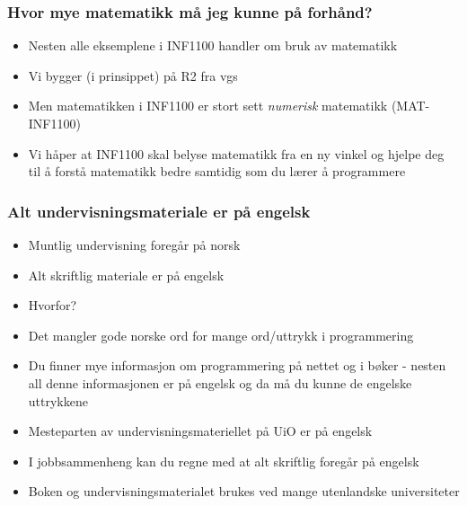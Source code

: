 \documentclass{beamer}
\begin{document}
\begin{frame}
\frametitle{Hvor mye matematikk må jeg kunne på forhånd?}

\begin{block}{}
\begin{itemize}
  \item Nesten alle eksemplene i INF1100 handler om bruk av matematikk

  \item Vi bygger (i prinsippet) på R2 fra vgs

  \item Men matematikken i INF1100 er stort sett \emph{numerisk} matematikk (MAT-INF1100)

  \item Vi håper at INF1100 skal belyse matematikk fra en ny vinkel og hjelpe deg til å forstå matematikk bedre samtidig som du lærer å programmere
\end{itemize}

\noindent
\end{block}
\end{frame}

\begin{frame}
\frametitle{Alt undervisningsmateriale er på engelsk}

\begin{block}{}
\begin{itemize}
  \item Muntlig undervisning foregår på norsk

  \item Alt skriftlig materiale er på engelsk

  \item Hvorfor?

  \item Det mangler gode norske ord for mange ord/uttrykk i programmering

  \item Du finner mye informasjon om programmering på nettet og i bøker - nesten all denne informasjonen er på engelsk og da må du kunne de engelske uttrykkene

  \item Mesteparten av undervisningsmateriellet på UiO er på engelsk

  \item I jobbsammenheng kan du regne med at alt skriftlig foregår på engelsk

  \item Boken og undervisningsmaterialet brukes ved mange utenlandske universiteter
\end{itemize}

\noindent
\end{block}
\end{frame}
\end{document}
